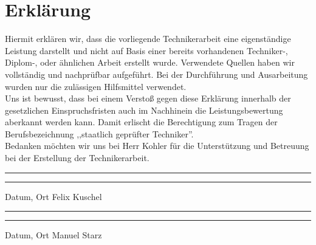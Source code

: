 \section*{Erklärung}\label{erklaerung}
Hiermit erklären wir, dass die vorliegende Technikerarbeit eine eigenständige Leistung darstellt und nicht auf Basis einer bereits vorhandenen Techniker-, Diplom-, oder ähnlichen Arbeit erstellt wurde.
Verwendete Quellen haben wir vollständig und nachprüfbar aufgeführt.
Bei der Durchführung und Ausarbeitung wurden nur die zulässigen Hilfsmittel verwendet.\\
\noindent Uns ist bewusst, dass bei einem Verstoß gegen diese Erklärung innerhalb der gesetzlichen Einspruchsfristen auch im Nachhinein die Leistungsbewertung aberkannt werden kann.
Damit erlischt die Berechtigung zum Tragen der Berufsbezeichnung ,,staatlich geprüfter Techniker''.\\
\noindent Bedanken möchten wir uns bei Herr Kohler für die Unterstützung und Betreuung bei der Erstellung der Technikerarbeit.
\vspace{2cm}	
\\
\noindent\rule{7cm}{.4pt}\hfill\rule{7cm}{.4pt}\par
\noindent Datum, Ort \hfill Felix Kuschel
\vspace{2cm}	
\\
\noindent\rule{7cm}{.4pt}\hfill\rule{7cm}{.4pt}\par
\noindent Datum, Ort \hfill Manuel Starz
\newpage